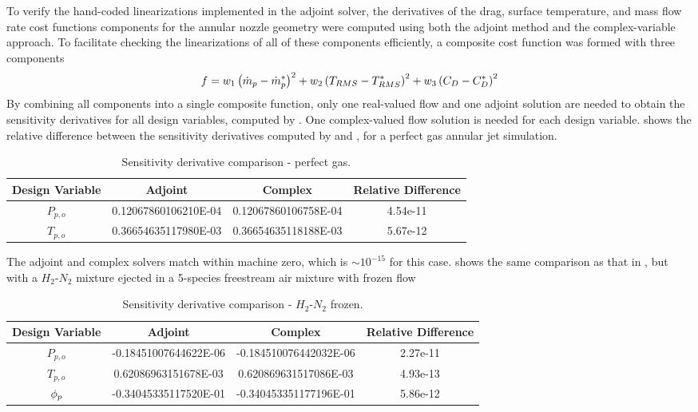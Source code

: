 To verify the hand-coded linearizations implemented in the adjoint solver, the
derivatives of the drag, surface temperature, and mass flow rate cost functions
components for the annular nozzle geometry were computed using both the adjoint
method and the complex-variable approach.  To facilitate checking the
linearizations of all of these components efficiently, a composite cost function
was formed with three components
\begin{equation} 
  f = w_1\left( \dot{m}_p - \dot{m}_p^{*}\right)^{2} 
  + w_2\left( T_{RMS} - T_{RMS}^*\right)^2
  + w_3\left( C_{D} - C_{D}^*\right)^2
  \label{check-cost-func}
\end{equation}
By combining all components into a single composite function, only one
real-valued flow and one adjoint solution are needed to obtain the sensitivity
derivatives for all design variables, computed by . One
complex-valued flow solution is needed for each design variable.
 shows the relative difference between the sensitivity
derivatives computed by  and , for a
perfect gas annular jet simulation.
\begin{table}[h]
  \centering 
  \caption{Sensitivity derivative comparison - perfect gas.}
  \begin{tabular}{c|c|c|c} 
    Design Variable & Adjoint & Complex & Relative Difference \\ 
    \hline 
    $P_{p,o}$ & 0.12067860106210E-04 & 0.12067860106758E-04 & 4.54e-11 \\
    $T_{p,o}$ & 0.36654635117980E-03 & 0.36654635118188E-03 & 5.67e-12 
  \end{tabular}
  \label{tab:pg-deriv-check}
\end{table}
The adjoint and complex solvers match within machine zero, which is $\sim
10^{-15}$ for this case.   shows the same
comparison as that in , but with a $H_2$-$N_2$ mixture
ejected in a 5-species freestream air mixture with frozen flow
\begin{table}[h] 
  \centering 
  \caption{Sensitivity derivative comparison - $H_2$-$N_2$ frozen.}
  \begin{tabular}{c|c|c|c} 
    Design Variable & Adjoint & Complex & Relative Difference\\
    \hline 
    $P_{p,o}$ & -0.18451007644622E-06 & -0.184510076442032E-06 & 2.27e-11 \\ 
    $T_{p,o}$ &  0.62086963151678E-03 &  0.620869631517086E-03 & 4.93e-13 \\ 
    $\phi_p$     & -0.34045335117520E-01 & -0.340453351177196E-01 & 5.86e-12 
  \end{tabular}
  \label{tab:frozen-deriv-check}
\end{table}
